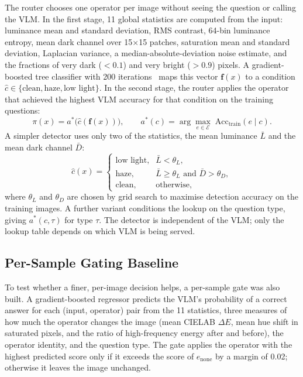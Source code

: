 \documentclass[lettersize,journal]{IEEEtran}
\begin{document}
The router chooses one operator per image without seeing the question or calling the VLM. In the first stage, 11 global statistics are computed from the input: luminance mean and standard deviation, RMS contrast, 64-bin luminance entropy, mean dark channel over 15$\times$15 patches, saturation mean and standard deviation, Laplacian variance, a median-absolute-deviation noise estimate, and the fractions of very dark ($<0.1$) and very bright ($>0.9$) pixels. A gradient-boosted tree classifier with 200 iterations~\cite{pedregosa2011sklearn} maps this vector $\mathbf{f}(x)$ to a condition $\hat{c} \in \{\text{clean}, \text{haze}, \text{low light}\}$. In the second stage, the router applies the operator that achieved the highest VLM accuracy for that condition on the training questions:
\begin{equation}
\pi(x) = a^{*}\big(\hat{c}(\mathbf{f}(x))\big), \qquad
a^{*}(c) = \arg\max_{e \in \mathcal{E}}\; \mathrm{Acc}_{\text{train}}(e \mid c).
\label{eq:router}
\end{equation}
A simpler detector uses only two of the statistics, the mean luminance $\bar{L}$ and the mean dark channel $\bar{D}$:
\begin{equation}
\hat{c}(x) =
\begin{cases}
\text{low light}, & \bar{L} < \theta_L,\\
\text{haze}, & \bar{L} \geq \theta_L \text{ and } \bar{D} > \theta_D,\\
\text{clean}, & \text{otherwise},
\end{cases}
\label{eq:threshold}
\end{equation}
where $\theta_L$ and $\theta_D$ are chosen by grid search to maximise detection accuracy on the training images. A further variant conditions the lookup on the question type, giving $a^{*}(c, \tau)$ for type $\tau$. The detector is independent of the VLM; only the lookup table depends on which VLM is being served.

\subsection{Per-Sample Gating Baseline}

To test whether a finer, per-image decision helps, a per-sample gate was also built. A gradient-boosted regressor predicts the VLM's probability of a correct answer for each (input, operator) pair from the 11 statistics, three measures of how much the operator changes the image (mean CIELAB $\Delta E$, mean hue shift in saturated pixels, and the ratio of high-frequency energy after and before), the operator identity, and the question type. The gate applies the operator with the highest predicted score only if it exceeds the score of $e_{\text{none}}$ by a margin of 0.02; otherwise it leaves the image unchanged.
\end{document}
